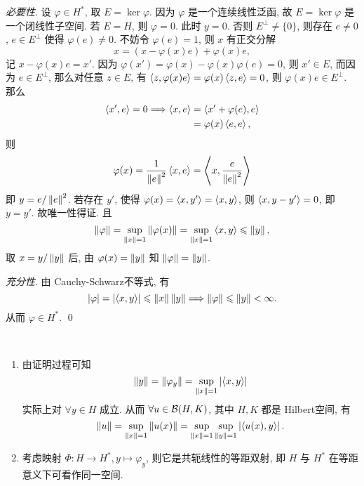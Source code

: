    \begin{Proof}
        \textsl{必要性}. 设 $ \varphi\in H^{*} $, 取 $ E=\ker\varphi $. 因为 $ \varphi $ 是一个连续线性泛函, 故 $ E=\ker\varphi $ 是一个闭线性子空间. 若 $ E=H $, 则 $ \varphi=0 $. 此时 $ y=0 $. 否则 $ E^{\bot}\ne\{0\} $, 则存在 $ e\ne0 $, $ e\in E^{\bot} $ 使得 $ \varphi(e)\ne0 $. 不妨令 $ \varphi(e)=1 $, 则 $ x $ 有正交分解
        \[
            x=(x-\varphi(x)e)+\varphi(x)e,
        \]
        记 $ x-\varphi(x)e=x' $. 因为 $ \varphi(x')=\varphi(x)-\varphi(x)\varphi(e)=0 $, 则 $ x'\in E $, 而因为 $ e\in E^{\bot} $, 那么对任意 $ z\in E $, 有 $ \left\langle z, \varphi(x)e \right\rangle=\varphi(x)\left\langle z, e \right\rangle=0 $, 则 $ \varphi(x)e\in E^{\bot} $. 那么
        \[
            \begin{aligned}
                \left\langle x', e \right\rangle=0\Longrightarrow \left\langle x, e \right\rangle & =\left\langle x'+\varphi(e), e \right\rangle\\
                & =\varphi(x)\left\langle e, e \right\rangle,
            \end{aligned}
        \]
        则
        \[
            \varphi(x)=\frac{1}{\left\| e \right\|^{2}}\left\langle x, e \right\rangle=\left\langle x, \frac{e}{\left\| e \right\|^{2}} \right\rangle
        \]
        即 $ y=e/\left\| e \right\|^{2} $. 若存在 $ y' $, 使得 $ \varphi(x)=\left\langle x, y' \right\rangle=\left\langle x, y \right\rangle $, 则 $ \left\langle x, y-y' \right\rangle=0 $, 即 $ y=y' $. 故唯一性得证. 且
        \[
            \left\| \varphi \right\|=\sup_{\left\| x \right\|=1}\left\| \varphi(x) \right\|=\sup_{\left\| x \right\|=1}\left\langle x, y \right\rangle\leqslant\left\| y \right\|,
        \]
        取 $ x=y/\left\| y \right\| $ 后, 由 $ \varphi(x)=\left\| y \right\| $ 知 $ \left\| \varphi \right\|=\left\| y \right\| $.

        \textsl{充分性}. 由 Cauchy-Schwarz不等式, 有
        \[
            \left| \varphi \right| =\left| \left\langle x, y \right\rangle \right| \leqslant\left\| x \right\|\left\| y \right\| \Longrightarrow \left\| \varphi \right\|\leqslant\left\| y \right\|<\infty.
        \]
        从而 $  \varphi\in H^{*} $. \qed
    \end{Proof}

    \begin{Remark}~
        \begin{enumerate}[(1)]
            \item 由证明过程可知
            \[
                \left\| y \right\|=\left\| \varphi_{y} \right\|=\sup_{\left\| x \right\|=1}\left| \left\langle x, y \right\rangle \right| 
            \]
            实际上对 $ \forall y\in H $ 成立. 从而 $ \forall u\in \mathcal{B}(H, K) $, 其中 $ H, K $ 都是 Hilbert空间, 有
            \[
                \left\| u \right\|=\sup_{\left\| x \right\|=1}\left\| u(x) \right\|=\sup_{\left\| x \right\|=1}\sup_{\left\| y \right\|=1}\left| \left\langle u(x), y \right\rangle \right| .
            \]
            \item 考虑映射 $ \varPhi: H\to H^{*}, y\mapsto \varphi_{y} $, 则它是共轭线性的等距双射, 即 $ H $ 与 $ H^{*} $ 在等距意义下可看作同一空间.
        \end{enumerate}
    \end{Remark}

